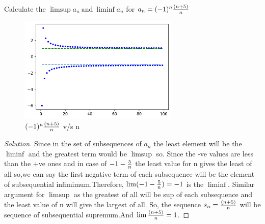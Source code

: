 \documentclass{notes}
\begin{document}
\paragraph{}
\begin{problem}
	Calculate the $\limsup a_n\ \text{and}\ \liminf a_n$ for $a_n = (-1)^n {(n+5) \over n}$ 
\end{problem}
\begin{figure}[h!]
	\hfill \includegraphics[height=2in,width=3in]{lim_sup_prob.png} \hspace*{\fill}  %
	\caption{$(-1)^n {(n+5) \over n}$ v/s n}
\end{figure}
\begin{proof}[Solution]
	Since in the set of subsequences of $a_n$ the least element will be the $\liminf$ and the greatest term would be $\limsup$ so. Since the -ve values are less than the +ve ones and in case of $-1 - {5 \over n}$  the least value for n gives the least of all so,we can say the first negative term of each subsequence will be the element of subsequential infimimum.Therefore, $\lim (-1 - {5 \over n}) = -1$ is  the $\liminf$.
	Similar argument for $\limsup$ as the greatest of all will be sup of each subsequence and the least value of n will give the largest of all. So, the sequence $ s_n = {(n+5) \over n}$
	will be sequence of subsequential supremum.And $\lim {(n+5) \over n} = 1$.
\end{proof}
\end{document}
